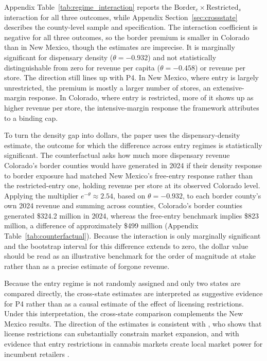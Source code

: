 \documentclass[english,12pt]{article}
\begin{document}
Appendix Table~\ref{tab:regime_interaction} reports the $\text{Border}_c \times \text{Restricted}_s$ interaction for all three outcomes, while Appendix Section~\ref{sec:crossstate} describes the county-level sample and specification. The interaction coefficient is negative for all three outcomes, so the border premium is smaller in Colorado than in New Mexico, though the estimates are imprecise. It is marginally significant for dispensary density ($\theta=-0.932$) and not statistically distinguishable from zero for revenue per capita ($\theta=-0.458$) or revenue per store. The direction still lines up with P4. In New Mexico, where entry is largely unrestricted, the premium is mostly a larger number of stores, an extensive-margin response. In Colorado, where entry is restricted, more of it shows up as higher revenue per store, the intensive-margin response the framework attributes to a binding cap.

To turn the density gap into dollars, the paper uses the dispensary-density estimate, the outcome for which the difference across entry regimes is statistically significant. The counterfactual asks how much more dispensary revenue Colorado's border counties would have generated in 2024 if their density response to border exposure had matched New Mexico's free-entry response rather than the restricted-entry one, holding revenue per store at its observed Colorado level. Applying the multiplier $e^{-\theta}\approx2.54$, based on $\theta=-0.932$, to each border county's own 2024 revenue and summing across counties, Colorado's border counties generated \$324.2 million in 2024, whereas the free-entry benchmark implies \$823 million, a difference of approximately \$499 million (Appendix Table~\ref{tab:counterfactual}). Because the interaction is only marginally significant and the bootstrap interval for this difference extends to zero, the dollar value should be read as an illustrative benchmark for the order of magnitude at stake rather than as a precise estimate of forgone revenue.

Because the entry regime is not randomly assigned and only two states are compared directly, the cross-state estimates are interpreted as suggestive evidence for P4 rather than as a causal estimate of the effect of licensing restrictions. Under this interpretation, the cross-state comparison complements the New Mexico results. The direction of the estimates is consistent with \citet{thomas2019license}, who shows that license restrictions can substantially constrain market expansion, and with evidence that entry restrictions in cannabis markets create local market power for incumbent retailers \citep{HollenbeckUetake2021}.
\end{document}
